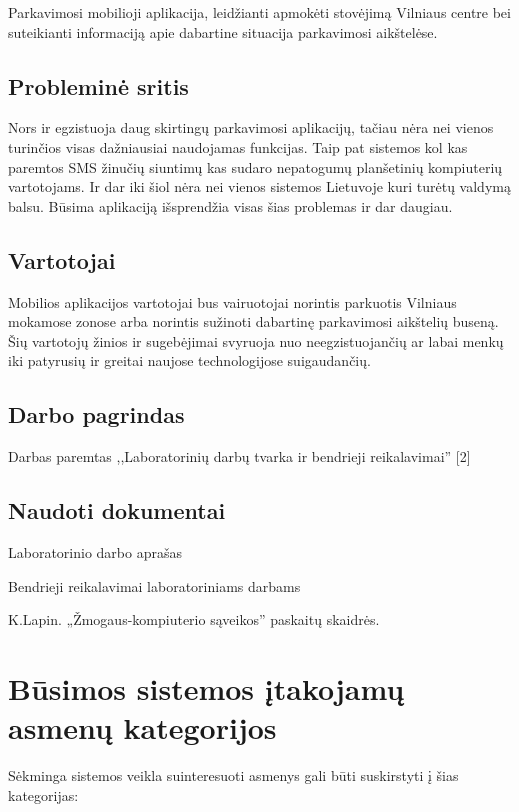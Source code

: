 \documentclass{VUMIFPSkursinis}
\begin{document}
Parkavimosi mobilioji aplikacija, leidžianti apmokėti stovėjimą Vilniaus centre bei suteikianti informaciją apie dabartine situacija parkavimosi aikštelėse.

\subsection*{Probleminė sritis}

Nors ir egzistuoja daug skirtingų parkavimosi aplikacijų, tačiau nėra nei vienos turinčios visas dažniausiai naudojamas funkcijas. Taip pat sistemos kol kas paremtos SMS žinučių siuntimų kas sudaro nepatogumų planšetinių kompiuterių vartotojams. Ir dar iki šiol nėra nei vienos sistemos Lietuvoje kuri turėtų valdymą balsu. Būsima aplikaciją išsprendžia visas šias problemas ir dar daugiau.

\subsection*{Vartotojai}

Mobilios aplikacijos vartotojai bus vairuotojai norintis parkuotis Vilniaus mokamose zonose arba norintis sužinoti dabartinę parkavimosi aikštelių buseną. Šių vartotojų žinios ir sugebėjimai svyruoja nuo neegzistuojančių ar labai menkų iki patyrusių ir greitai naujose technologijose suigaudančių. 


\subsection*{Darbo pagrindas}

Darbas paremtas ,,Laboratorinių darbų tvarka ir bendrieji reikalavimai'' [2]

\subsection*{Naudoti dokumentai}

\begin{enumerate} [label = {[\arabic*]}]
	\item Laboratorinio darbo aprašas
	\item Bendrieji reikalavimai laboratoriniams darbams
	\item K.Lapin. „Žmogaus-kompiuterio sąveikos” paskaitų skaidrės. 
\end{enumerate}

\section{Būsimos sistemos įtakojamų asmenų kategorijos}
Sėkminga sistemos veikla suinteresuoti asmenys gali būti suskirstyti į šias kategorijas:
\end{document}
